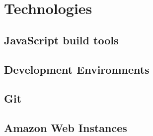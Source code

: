\documentclass[]{report}
\begin{document}
		\section{Technologies}
			\subsection{JavaScript build tools}
			\subsection{Development Environments}
			\subsection{Git}
			\subsection{Amazon Web Instances}
\end{document}
